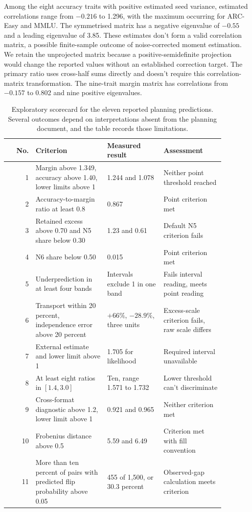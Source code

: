 Among the eight accuracy traits with positive estimated seed variance, estimated correlations range from $-0.216$ to 1.296, with the maximum occurring for ARC-Easy and MMLU. The symmetrised matrix has a negative eigenvalue of $-0.55$ and a leading eigenvalue of 3.85. These estimates don't form a valid correlation matrix, a possible finite-sample outcome of noise-corrected moment estimation. We retain the unprojected matrix because a positive-semidefinite projection would change the reported values without an established correction target. The primary ratio uses cross-half sums directly and doesn't require this correlation-matrix transformation. The nine-trait margin matrix has correlations from $-0.157$ to 0.802 and nine positive eigenvalues.

\begin{table}[htbp]
\centering\scriptsize
\caption{Exploratory scorecard for the eleven reported planning predictions. Several outcomes depend on interpretations absent from the planning document, and the table records those limitations.}
\label{tab:original6}
\begin{tabular}{rp{0.33\linewidth}p{0.26\linewidth}p{0.29\linewidth}}\hline
No. & Criterion & Measured result & Assessment\\\hline
1 & Margin above 1.349, accuracy above 1.40, lower limits above 1 & 1.244 and 1.078 & Neither point threshold reached\\
2 & Accuracy-to-margin ratio at least 0.8 & 0.867 & Point criterion met\\
3 & Retained excess above 0.70 and N5 share below 0.30 & 1.23 and 0.61 & Default N5 criterion fails\\
4 & N6 share below 0.50 & 0.015 & Point criterion met\\
5 & Underprediction in at least four bands & Intervals exclude 1 in one band & Fails interval reading, meets point reading\\
6 & Transport within 20 percent, independence error above 20 percent & $+66\%$, $-28.9\%$, three units & Excess-scale criterion fails, raw scale differs\\
7 & External estimate and lower limit above 1 & 1.705 for likelihood & Required interval unavailable\\
8 & At least eight ratios in $[1.4,3.0]$ & Ten, range 1.571 to 1.732 & Lower threshold can't discriminate\\
9 & Cross-format diagnostic above 1.2, lower limit above 1 & 0.921 and 0.965 & Neither criterion met\\
10 & Frobenius distance above 0.5 & 5.59 and 6.49 & Criterion met with fill convention\\
11 & More than ten percent of pairs with predicted flip probability above 0.05 & 455 of 1,500, or 30.3 percent & Observed-gap calculation meets criterion\\\hline
\end{tabular}
\end{table}


